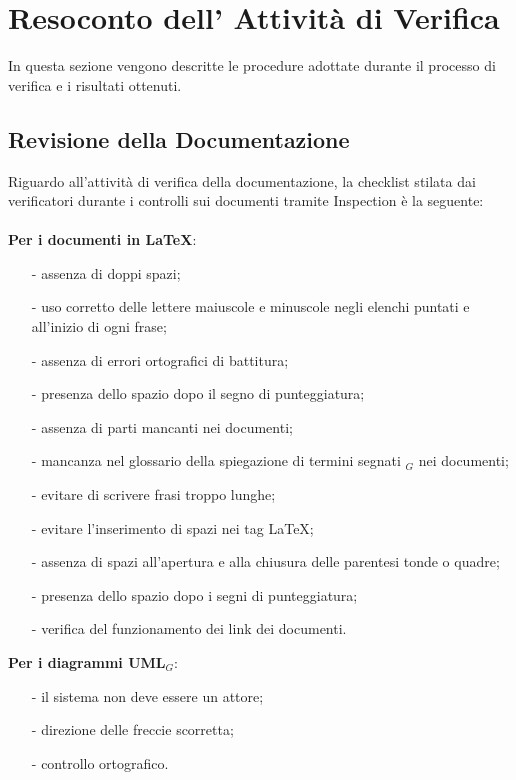 \section{Resoconto dell' Attività di Verifica}
In questa sezione vengono descritte le procedure adottate durante il processo di
verifica e i risultati ottenuti.
\subsection{Revisione della Documentazione}
Riguardo all'attività di verifica della documentazione, la checklist stilata dai verificatori durante i controlli sui documenti tramite Inspection è la seguente:\\ \\
\textbf{Per i documenti in \LaTeX}:
\begin{itemize}
	\item[-] assenza di doppi spazi;
	\item[-] uso corretto delle lettere maiuscole e minuscole negli elenchi puntati e all'inizio di ogni frase;
	\item[-] assenza di errori ortografici di battitura;
	\item[-] presenza dello spazio dopo il segno di punteggiatura; 
	\item[-] assenza di parti mancanti nei documenti;
	\item[-] mancanza nel glossario della spiegazione di termini segnati $_G$ nei documenti;
	\item[-] evitare di scrivere frasi troppo lunghe;
	\item[-] evitare l'inserimento di spazi nei tag \LaTeX{};
	\item[-] assenza di spazi all'apertura e alla chiusura delle parentesi tonde o quadre;
	\item[-] presenza dello spazio dopo i segni di punteggiatura; 
	\item[-] verifica del funzionamento dei link dei documenti.
\end{itemize}
\textbf{Per i diagrammi UML$_G$}:
\begin{itemize}
	\item[-] il sistema non deve essere un attore;
	\item[-] direzione delle freccie scorretta;
	\item[-] controllo ortografico.
\end{itemize}
